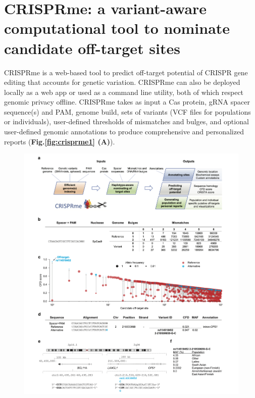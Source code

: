 \documentclass[a4paper, titlepage, openright]{book}
\begin{document}
\section{CRISPRme: a variant-aware computational tool to nominate candidate off-target sites}
CRISPRme is a web-based tool to predict off-target potential of CRISPR gene editing that accounts for genetic variation. CRISPRme can also be deployed locally as a web app or used as a command line utility, both of which respect genomic privacy offline. CRISPRme takes as input a Cas protein, gRNA spacer sequence(s) and PAM, genome build, sets of variants (VCF files for populations or individuals), user-defined thresholds of mismatches and bulges, and optional user-defined genomic annotations to produce comprehensive and personalized reports (\textbf{Fig.\ref{fig:crisprme1} (A)}).
\begin{figure}
	\centering
	\includegraphics[width=\textwidth]{figures/crisprme1.png}

\end{figure}
\end{document}
